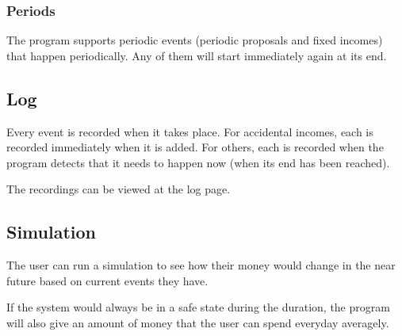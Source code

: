 \documentclass{article}
\begin{document}
\subsubsection{Periods}
The program supports periodic events (periodic proposals and fixed incomes) that happen periodically. Any of them will start immediately again at its end.

\subsection{Log}
Every event is recorded when it takes place. For accidental incomes, each is recorded immediately when it is added. For others, each is recorded when the program detects that it needs to happen now (when its end has been reached).

The recordings can be viewed at the log page.

\subsection{Simulation}
The user can run a simulation to see how their money would change in the near future based on current events they have.

If the system would always be in a safe state during the duration, the program will also give an amount of money that the user can spend everyday averagely.
	
\end{document}
